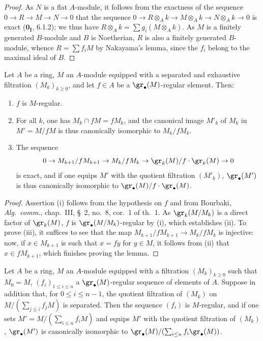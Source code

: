 \begin{proof}
As $N$ is a flat $A$-module, it follows from the exactness of the sequence $0\to R\to M\to N\to 0$ that the sequence $0\to R\otimes_Ak\to M\otimes_Ak\to N\otimes_Ak\to 0$ is exact ($\mathbf{0_I}$, 6.1.2);
we thus have $R\otimes_Ak=\sum g_i(M\otimes_Ak)$.
As $M$ is a finitely generated $B$-module and $B$ is Noetherian, $R$ is also a finitely generated $B$-module, whence $R=\sum f_iM$ by Nakayama's lemma, since the $f_i$ belong to the maximal ideal of $B$.
\end{proof}

\begin{lemma}[15.1.18]
\label{0.15.1.18}
Let $A$ be a ring, $M$ an $A$-module equipped with a separated and exhaustive filtration $(M_k)_{k\geq 0}$, and let $f\in A$ be a $\gr_\bullet(M)$-regular element.
Then:
\begin{enumerate}
  \item[(i)] $f$ is $M$-regular.
  \item[(ii)] For all $k$, one has $M_k\cap fM=fM_k$, and the canonical image $M'_k$ of $M_k$ in $M'=M/fM$ is thus canonically isomorphic to $M_k/fM_k$.
  \item[(iii)] The sequence
  \[
    0 \to M_{k+1}/fM_{k+1} \to M_k/fM_k \to \gr_k(M)/f\cdot\gr_k(M) \to 0
  \]
  is exact, and if one equips $M'$ with the quotient filtration $(M'_k)$, $\gr_\bullet(M')$ is thus canonically isomorphic to $\gr_\bullet(M)/f\cdot\gr_\bullet(M)$.
\end{enumerate}
\end{lemma}

\begin{proof}
Assertion (i) follows from the hypothesis on $f$ and from Bourbaki, \emph{Alg.~comm.}, chap.~III, \S~2, no.~8, cor.~1 of th.~1.
As $\gr_k(M/M_k)$ is a direct factor of $\gr_k(M)$, $f$ is $\gr_\bullet(M/M_k)$-regular by (i), which establishes (ii).
To prove (iii), it suffices to see that the map $M_{k+1}/fM_{k+1}\to M_k/fM_k$ is injective:
now, if $x\in M_{k+1}$ is such that $x=fy$ for $y\in M$, it follows from (ii) that $x\in fM_{k+1}$, which finishes proving the lemma.
\end{proof}

\begin{proposition}[15.1.19]
\label{0.15.1.19}
Let $A$ be a ring, $M$ an $A$-module equipped with a filtration $(M_k)_{k\geq 0}$ such that $M_0=M$, $(f_i)_{1\leq i\leq n}$ a $\gr_\bullet(M)$-regular sequence of elements of $A$.
Suppose in addition that, for $0\leq i\leq n-1$, the quotient filtration of $(M_k)$ on $M/(\sum_{j\leq i}f_jM)$ is separated.
Then the sequence $(f_i)$ is $M$-regular, and if one sets $M'=M/(\sum_{i\leq n}f_iM)$ and equips $M'$ with the quotient filtration of $(M_k)$, $\gr_\bullet(M')$ is canonically isomorphic to $\gr_\bullet(M)/(\sum_{i\leq n}f_i\gr_\bullet(M))$.
\end{proposition}

